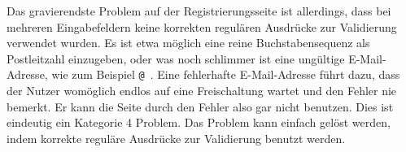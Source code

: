 { Das gravierendste Problem auf der Registrierungsseite ist allerdings, dass bei mehreren Eingabefeldern keine korrekten regulären Ausdrücke zur Validierung verwendet wurden. Es ist etwa möglich eine reine Buchstabensequenz als Postleitzahl einzugeben, oder was noch schlimmer ist eine ungültige E-Mail-Adresse, wie zum Beispiel \glqq \texttt{@}\grqq ~.
}
{ Eine fehlerhafte E-Mail-Adresse führt dazu, dass der Nutzer womöglich endlos auf eine Freischaltung wartet und den Fehler nie bemerkt. Er kann die Seite durch den Fehler also gar nicht benutzen. Dies ist eindeutig ein Kategorie 4 Problem.}
{ Das Problem kann einfach gelöst werden, indem korrekte reguläre Ausdrücke zur Validierung benutzt werden.
} 


